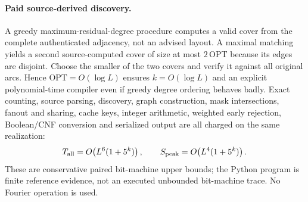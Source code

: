 \documentclass[11pt]{article}
\begin{document}
\paragraph{Paid source-derived discovery.}
A greedy maximum-residual-degree procedure computes a valid
cover from the complete authenticated adjacency, not an advised
layout. A maximal matching yields a second source-computed cover
of size at most $2\,\mathrm{OPT}$ because its edges are disjoint.
Choose the smaller of the two covers and verify it against all
original arcs. Hence $\mathrm{OPT}=O(\log L)$ ensures
$k=O(\log L)$ and an explicit polynomial-time compiler even
if greedy degree ordering behaves badly. Exact counting,
source parsing, discovery, graph construction, mask intersections,
fanout and sharing, cache keys, integer arithmetic, weighted
early rejection, Boolean/CNF conversion and serialized output
are all charged on the same realization:
\[
T_{\rm all}=O\!\left(L^6(1+5^k)\right),\qquad
S_{\rm peak}=O\!\left(L^4(1+5^k)\right).
\]
These are conservative paired bit-machine upper bounds; the
Python program is finite reference evidence, not an executed
unbounded bit-machine trace. No Fourier operation is used.
\end{document}
